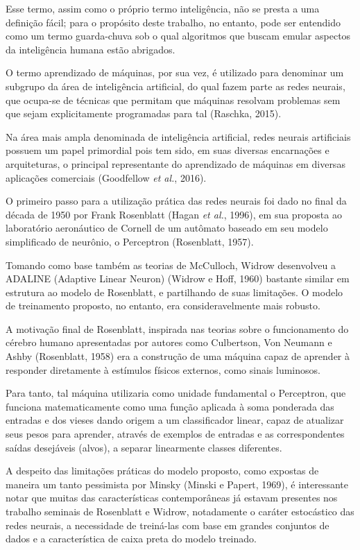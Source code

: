 \documentclass[]{article}
\begin{document}
Esse termo, assim como o próprio termo inteligência, não se presta a uma
definição fácil; para o propósito deste trabalho, no entanto, pode ser
entendido como um termo guarda-chuva sob o qual algoritmos que buscam
emular aspectos da inteligência humana estão abrigados.

O termo aprendizado de máquinas, por sua vez, é utilizado para denominar
um subgrupo da área de inteligência artificial, do qual fazem parte as
redes neurais, que ocupa-se de técnicas que permitam que máquinas
resolvam problemas sem que sejam explicitamente programadas para tal
(Raschka, 2015).

Na área mais ampla denominada de inteligência artificial, redes neurais
artificiais possuem um papel primordial pois tem sido, em suas diversas
encarnações e arquiteturas, o principal representante do aprendizado de
máquinas em diversas aplicações comerciais (Goodfellow \emph{et al.},
2016).

O primeiro passo para a utilização prática das redes neurais foi dado no
final da década de 1950 por Frank Rosenblatt (Hagan \emph{et al.},
1996), em sua proposta ao laboratório aeronáutico de Cornell de um
autômato baseado em seu modelo simplificado de neurônio, o Perceptron
(Rosenblatt, 1957).

Tomando como base também as teorias de McCulloch, Widrow desenvolveu a
ADALINE (Adaptive Linear Neuron) (Widrow e Hoff, 1960) bastante similar
em estrutura ao modelo de Rosenblatt, e partilhando de suas limitações.
O modelo de treinamento proposto, no entanto, era consideravelmente mais
robusto.

A motivação final de Rosenblatt, inspirada nas teorias sobre o
funcionamento do cérebro humano apresentadas por autores como
Culbertson, Von Neumann e Ashby (Rosenblatt, 1958) era a construção de
uma máquina capaz de aprender à responder diretamente à estímulos
físicos externos, como sinais luminosos.

Para tanto, tal máquina utilizaria como unidade fundamental o
Perceptron, que funciona matematicamente como uma função aplicada à soma
ponderada das entradas e dos vieses dando origem a um classificador
linear, capaz de atualizar seus pesos para aprender, através de exemplos
de entradas e as correspondentes saídas desejáveis (alvos), a separar
linearmente classes diferentes.

A despeito das limitações práticas do modelo proposto, como expostas de
maneira um tanto pessimista por Minsky (Minski e Papert, 1969), é
interessante notar que muitas das características contemporâneas já
estavam presentes nos trabalho seminais de Rosenblatt e Widrow,
notadamente o caráter estocástico das redes neurais, a necessidade de
treiná-las com base em grandes conjuntos de dados e a característica de
caixa preta do modelo treinado.
\end{document}
